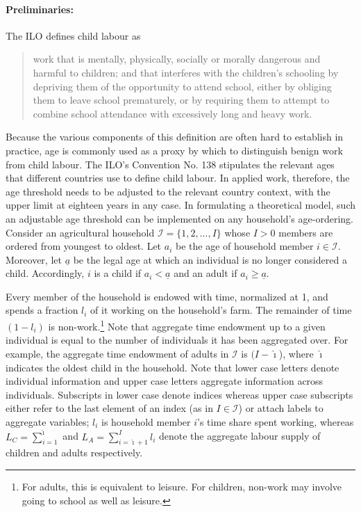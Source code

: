 \documentclass[a4paper,12pt]{article}
\theoremstyle{plain}
\theoremstyle{definition}
\theoremstyle{definition}
\theoremstyle{definition}
\theoremstyle{definition}
\begin{document}
\paragraph{Preliminaries:}
The ILO defines child labour as

\begin{quote}
work that is mentally, physically, socially or morally dangerous and harmful to children; and that interferes with the children’s schooling by depriving them of the opportunity to attend school, either by obliging them to leave school prematurely, or by requiring them to attempt to combine school attendance with excessively long and heavy work.
\end{quote}
Because the various components of this definition are often hard to establish in practice, age is commonly used as a proxy by which to distinguish benign work from child labour. The ILO’s Convention No. 138 stipulates the relevant ages that different countries use to define child labour. In applied work, therefore, the age threshold needs to be adjusted to the relevant country context, with the upper limit at eighteen years in any case. In formulating a theoretical model, such an adjustable age threshold can be implemented on any household's age-ordering. Consider an agricultural household $\mathcal{I}=\{1,2,...,I\}$ whose $I>0$ members are ordered from youngest to oldest. Let $a_i$ be the age of household member $i\in\mathcal{I}$. Moreover, let $\underline{a}$ be the legal age at which an individual is no longer considered a child. Accordingly, $i$ is a child if $a_i<\underline{a}$ and an adult if $a_i\geq \underline{a}$.

Every member of the household is endowed with time, normalized at 1, and spends a fraction $l_i$ of it working on the household's farm. The remainder of time $(1-l_i)$ is non-work.\footnote{For adults, this is equivalent to leisure. For children, non-work may involve going to school as well as leisure.} Note that aggregate time endowment up to a given individual is equal to the number of individuals it has been aggregated over. For example, the aggregate time endowment of adults in $\mathcal{I}$ is $(I-\hat{\imath}$), where $\hat{\imath}$ indicates the oldest child in the household. Note that lower case letters denote individual information and upper case letters aggregate information across individuals. Subscripts in lower case denote indices whereas upper case subscripts either refer to the last element of an index (as in $I\in \mathcal{I}$) or attach labels to aggregate variables; $l_i$ is household member $i$'s time share spent working, whereas $L_C=\sum_{i=1}^{\hat{\imath}}$ and $L_A=\sum_{i=\hat{\imath}+1}^Il_i$ denote the aggregate labour supply of children and adults respectively.
\end{document}
